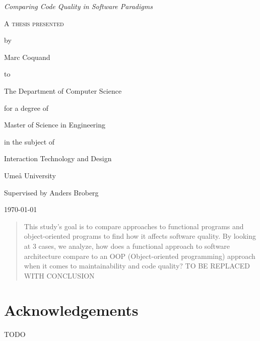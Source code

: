 \documentclass[12pt]{report}
\theoremstyle{definition}
\theoremstyle{theorem}
\begin{document}
\begin{titlepage}
	\centering
    \null
    \vfill
    {\Large\itshape Comparing Code Quality in Software Paradigms
    \par}
    \vspace{3.0cm}
	{\scshape 
    A thesis presented \par 
    by\par
	Marc Coquand\par
	to\par
    The Department of Computer Science\par
    \vspace{0.8cm}
	for a degree of\par
    Master of Science in Engineering\par
    in the subject of\par
    Interaction Technology and Design\par}
    \vfill
    Umeå University\par
    Supervised by Anders Broberg\par
	\today\par
\end{titlepage}
\clearpage
\thispagestyle{empty}

\clearpage\newpage
\thispagestyle{empty}

\begin{abstract} 

    This study's goal is to compare approaches to functional programs and
    object-oriented programs to find how it affects software quality. By looking
    at 3 cases, we analyze, how does a functional approach to software
    architecture compare to an OOP (Object-oriented programming) approach when
    it comes to maintainability and code quality? TO BE REPLACED WITH CONCLUSION

\end{abstract}

\clearpage\newpage
\thispagestyle{empty}

\section*{Acknowledgements}

TODO

\clearpage\newpage
\thispagestyle{empty}

\tableofcontents
\newpage




\end{document}
